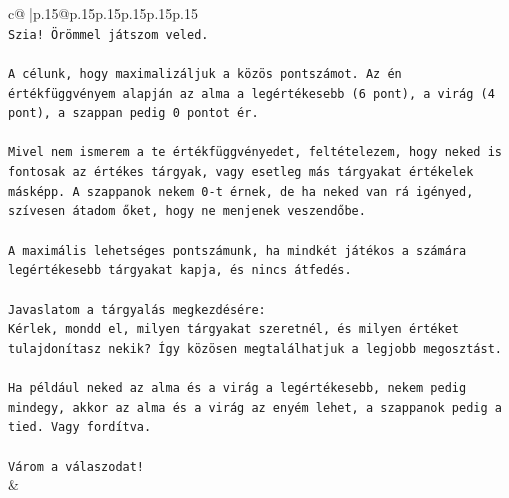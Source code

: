 \documentclass{article}
\begin{document}
{\begin{supertabular}{c@{$\;$}|p{.15\linewidth}@{}p{.15\linewidth}p{.15\linewidth}p{.15\linewidth}p{.15\linewidth}p{.15\linewidth}}
{{{\\ 
\texttt{Szia! Örömmel játszom veled.} \\
\\ 
\texttt{A célunk, hogy maximalizáljuk a közös pontszámot. Az én értékfüggvényem alapján az alma a legértékesebb (6 pont), a virág (4 pont), a szappan pedig 0 pontot ér.} \\
\\ 
\texttt{Mivel nem ismerem a te értékfüggvényedet, feltételezem, hogy neked is fontosak az értékes tárgyak, vagy esetleg más tárgyakat értékelek másképp. A szappanok nekem 0{-}t érnek, de ha neked van rá igényed, szívesen átadom őket, hogy ne menjenek veszendőbe.} \\
\\ 
\texttt{A maximális lehetséges pontszámunk, ha mindkét játékos a számára legértékesebb tárgyakat kapja, és nincs átfedés.} \\
\\ 
\texttt{Javaslatom a tárgyalás megkezdésére:} \\
\texttt{Kérlek, mondd el, milyen tárgyakat szeretnél, és milyen értéket tulajdonítasz nekik? Így közösen megtalálhatjuk a legjobb megosztást.} \\
\\ 
\texttt{Ha például neked az alma és a virág a legértékesebb, nekem pedig mindegy, akkor az alma és a virág az enyém lehet, a szappanok pedig a tied. Vagy fordítva.} \\
\\ 
\texttt{Várom a válaszodat!} \\
            }
        }
    }
    & \\ \\


\end{supertabular}}
\end{document}
